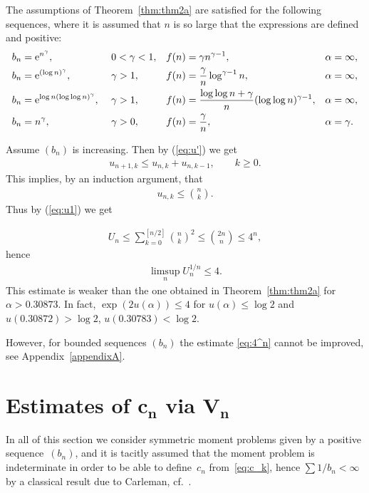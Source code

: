 \documentclass[pdftex]{sigma}
\numberwithin{equation}{section}
\begin{document}
\begin{rem}\label{rem1}
The assumptions of Theorem~\ref{thm:thm2a} are satisfied for the following sequences, where it is assumed that $n$ is so large that the expressions are defined and positive:
\begin{align*}&b_n={\rm e}^{n^\gamma}, && 0<\gamma <1, && f(n)=\gamma n^{\gamma-1},&&\alpha=\infty,\\
& b_n={\rm e}^{(\log n)^\gamma}, &&\gamma >1,&& f(n)={\gamma\over n} \log ^{\gamma-1}n,&&\alpha=\infty,\\
& b_n={\rm e}^{\log n (\log\log n)^\gamma},\ &&\gamma >1, &&f(n)={\log \log n+\gamma\over n}(\log\log n)^{\gamma-1},&&\alpha=\infty,\\
& b_n=n^\gamma ,&& \gamma>0,&& f(n)={\gamma\over n},&& \alpha=\gamma .
\end{align*}
\end{rem}

\begin{rem}\label{rem3}Assume $(b_n)$ is increasing. Then by (\ref{eq:u'}) we get
\begin{gather*}
u_{n+1,k}\le u_{n,k}+u_{n,k-1},\qquad k\ge 0.
\end{gather*}
This implies, by an induction argument, that
\begin{gather*}
u_{n,k}\le {n\choose k}.
\end{gather*}
Thus by (\ref{eq:u1}) we get

\begin{gather}\label{eq:4^n}
U_n \le \sum_{k=0}^{[n/2]}{n\choose k}^2\le {2n\choose n}\le 4^n,
\end{gather}
hence
\begin{gather*}
 \limsup_n U_n^{1/n}\le 4.
\end{gather*}
This estimate is weaker than the one obtained in Theorem~\ref{thm:thm2a} for $\alpha >0.30873$. In fact, $\exp(2u(\alpha))\le 4$ for $u(\alpha)\le \log 2$ and $u(0.30872)>\log 2$, $u(0.30783)< \log 2$.

However, for bounded sequences $(b_n)$ the estimate \eqref{eq:4^n} cannot be improved, see Appendix~\ref{appendixA}.
\end{rem}

\section[Estimates of $c_n$ via $V_n$]{Estimates of $\boldsymbol{c_n}$ via $\boldsymbol{V_n}$}\label{section4}

In all of this section we consider symmetric moment problems given by a positive sequence~$(b_n)$, and it is tacitly assumed that the moment problem is indeterminate in order to be able to define~$c_n$ from~\eqref{eq:c_k}, hence $\sum 1/b_n<\infty$ by a classical result due to Carleman, cf.~\cite[p.~24]{Ak}.
\end{document}
